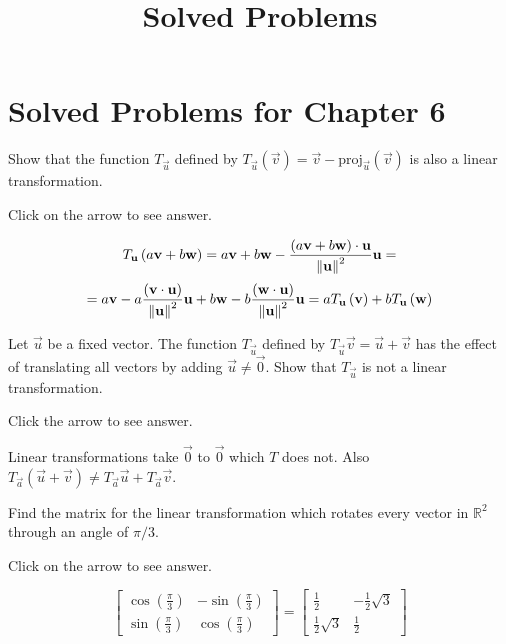 \documentclass{ximera}
\title{Solved Problems} \license{CC BY-NC-SA 4.0}
\begin{document}
\begin{abstract}
\end{abstract}
\maketitle

\section*{Solved Problems for Chapter 6}

\begin{problem}\label{prb:6.2} Show that the function $T_{\vec{u}}$ defined by $T_{\vec{u}}
\left( \vec{v}\right) = \vec{v}-\mbox{proj}_{\vec{u}}\left(
\vec{v}\right) $ is also a linear transformation.

Click on the arrow to see answer.

\begin{expandable}
$$
T_{\mathbf{u}}\left( a\mathbf{v}+b\mathbf{w}\right) =a\mathbf{v}+b\mathbf{w}-\frac{\left( a\mathbf{v}+b\mathbf{w}\right)\cdot \mathbf{u} }{\left\lVert \mathbf{u}
\right\rVert ^{2}}\mathbf{u} =$$
$$
=a\mathbf{v}-a\frac{\left( \mathbf{v}\cdot \mathbf{u}\right) }{\left\lVert \mathbf{u} \right\rVert ^{2}}\mathbf{u}+b\mathbf{w}-b\frac{\left( \mathbf{w}\cdot \mathbf{u}
\right) }{\left\lVert \mathbf{u}\right\rVert ^{2}}\mathbf{u}
=aT_{\mathbf{u}}\left( \mathbf{v}\right) +bT_{\mathbf{u}}\left( \mathbf{w}
\right)
$$
\end{expandable}
\end{problem}

\begin{problem}\label{prb:6.3} Let $\vec{u}$ be a fixed vector. The function
$T_{\vec{u}}$ defined by $T_{\vec{u}}\vec{v}=\vec{u}+\vec{v}$ has the effect of
translating all vectors by adding $\vec{u}\neq \vec{0}$. Show that $T_{\vec{u}}$ is not a
linear transformation. 

Click the arrow to see answer.

\begin{expandable}
Linear
transformations take $\vec{0}$ to $\vec{0}$ which $T$ does not. Also $T_{\vec{a}}\left( \vec{u}+\vec{v}\right) \neq T_{\vec{a}}\vec{u}+T_{\vec{a}}
\vec{v}$.
\end{expandable}
\end{problem}

\begin{problem}\label{prb:6.11}  Find the matrix for the linear transformation which
rotates every vector in $\mathbb{R}^{2}$ through an angle of $\pi /3.$

Click on the arrow to see answer.
\begin{expandable}
$$\left[
\begin{array}{cc}
\cos \left(
\frac{\pi }{3}\right) & -\sin \left( \frac{\pi }{3}\right) \\
\sin \left( \frac{\pi }{3}\right) & \cos \left( \frac{\pi }{3}\right)%
\end{array}
\right] = \left[
\begin{array}{cc}
\frac{1}{2} & -\frac{1}{2}\sqrt{3} \\
\frac{1}{2}\sqrt{3} & \frac{1}{2}
\end{array}
\right] $$
\end{expandable}
\end{problem}
\end{document}
